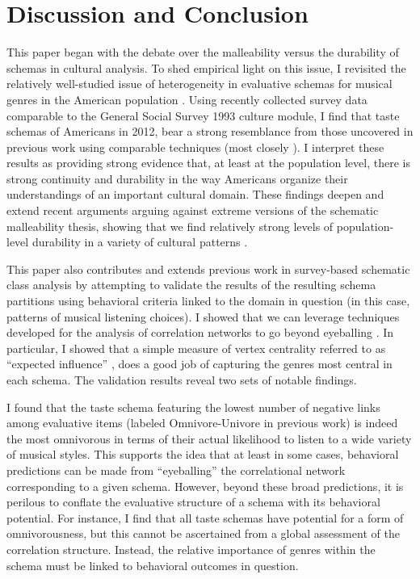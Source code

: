 \documentclass[preprint, authoryear,11pt, 3p]{elsarticle}
\begin{document}
\section{Discussion and Conclusion}
This paper began with the debate over the malleability versus the durability of schemas in cultural analysis. To shed empirical light on this issue, I revisited the relatively well-studied issue of heterogeneity in evaluative schemas for musical genres in the American population \citep{goldberg2011mapping}. Using recently collected survey data comparable to the General Social Survey 1993 culture module, I find that taste schemas of Americans in 2012, bear a strong resemblance from those uncovered in previous work using comparable techniques (most closely \citet{boutyline2017improving}). I interpret these results as providing strong evidence that, at least at the population level, there is strong continuity and durability in the way Americans organize their understandings of an important cultural domain. These findings deepen and extend recent arguments arguing against extreme versions of the schematic malleability thesis, showing that we find relatively strong levels of population-level durability in a variety of cultural patterns \citep{vaisey2016cultural}.

This paper also contributes and extends previous work in survey-based schematic class analysis by attempting to validate the results of the resulting schema partitions using behavioral criteria linked to the domain in question (in this case, patterns of musical listening choices). I showed that we can leverage techniques developed for the analysis of correlation networks to go beyond eyeballing \citep{epskamp2012qgraph,networktools}. In particular, I showed that a simple measure of vertex centrality referred to as ``expected influence'' \citep{robinaugh2016identifying}, does a good job of capturing the genres most central in each schema. The validation results reveal two sets of notable findings. 

I found that the taste schema featuring the lowest number of negative links among evaluative items (labeled Omnivore-Univore in previous work) is indeed the most omnivorous in terms of their actual likelihood to listen to a wide variety of musical styles. This supports the idea that at least in some cases, behavioral predictions can be made from ``eyeballing'' the correlational network corresponding to a given schema. However, beyond these broad predictions, it is perilous to conflate the evaluative structure of a schema with its behavioral potential. For instance, I find that all taste schemas have potential for a form of omnivorousness, but this cannot be ascertained from a global assessment of the correlation structure. Instead, the relative importance of genres within the schema must be linked to behavioral outcomes in question. 
\end{document}
